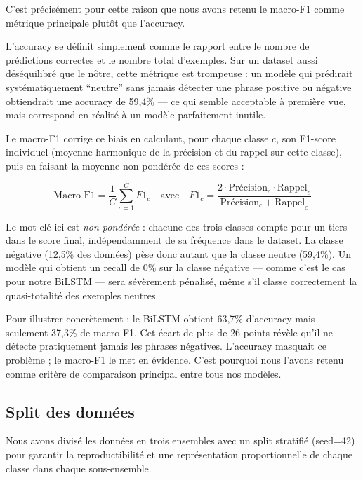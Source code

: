\documentclass[12pt, a4paper]{article}
\begin{document}
C'est précisément pour cette raison que nous avons retenu le macro-F1 comme métrique
principale plutôt que l'accuracy.

L'accuracy se définit simplement comme le rapport entre le nombre de prédictions
correctes et le nombre total d'exemples. Sur un dataset aussi déséquilibré que le
nôtre, cette métrique est trompeuse : un modèle qui prédirait systématiquement
``neutre'' sans jamais détecter une phrase positive ou négative obtiendrait une
accuracy de 59,4\% --- ce qui semble acceptable à première vue, mais correspond
en réalité à un modèle parfaitement inutile.

Le macro-F1 corrige ce biais en calculant, pour chaque classe $c$, son F1-score
individuel (moyenne harmonique de la précision et du rappel sur cette classe), puis
en faisant la moyenne non pondérée de ces scores :

\begin{equation}
  \text{Macro-F1} = \frac{1}{C} \sum_{c=1}^{C} F1_c
  \quad \text{avec} \quad
  F1_c = \frac{2 \cdot \text{Précision}_c \cdot \text{Rappel}_c}{\text{Précision}_c + \text{Rappel}_c}
\end{equation}

Le mot clé ici est \textit{non pondérée} : chacune des trois classes compte pour
un tiers dans le score final, indépendamment de sa fréquence dans le dataset.
La classe négative (12,5\% des données) pèse donc autant que la classe neutre
(59,4\%). Un modèle qui obtient un recall de 0\% sur la classe négative --- comme
c'est le cas pour notre BiLSTM --- sera sévèrement pénalisé, même s'il classe
correctement la quasi-totalité des exemples neutres.

Pour illustrer concrètement : le BiLSTM obtient 63,7\% d'accuracy mais seulement
37,3\% de macro-F1. Cet écart de plus de 26 points révèle qu'il ne détecte
pratiquement jamais les phrases négatives. L'accuracy masquait ce problème ;
le macro-F1 le met en évidence. C'est pourquoi nous l'avons retenu comme critère
de comparaison principal entre tous nos modèles.

\subsection{Split des données}

Nous avons divisé les données en trois ensembles avec un split stratifié (seed=42)
pour garantir la reproductibilité et une représentation proportionnelle de chaque
classe dans chaque sous-ensemble.
\end{document}
